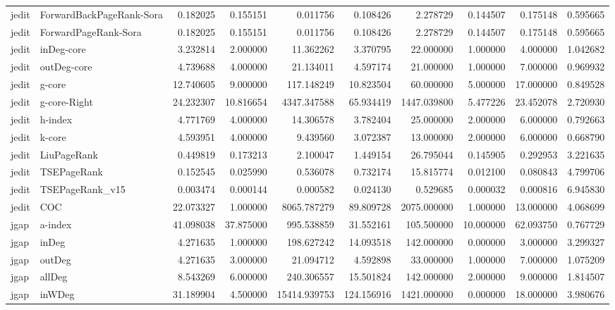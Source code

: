 \begin{tabular}{llrrrrrrrr}
jedit & ForwardBackPageRank-Sora & 0.182025 & 0.155151 & 0.011756 & 0.108426 & 2.278729 & 0.144507 & 0.175148 & 0.595665 \\
jedit & ForwardPageRank-Sora & 0.182025 & 0.155151 & 0.011756 & 0.108426 & 2.278729 & 0.144507 & 0.175148 & 0.595665 \\
jedit & inDeg-core & 3.232814 & 2.000000 & 11.362262 & 3.370795 & 22.000000 & 1.000000 & 4.000000 & 1.042682 \\
jedit & outDeg-core & 4.739688 & 4.000000 & 21.134011 & 4.597174 & 21.000000 & 1.000000 & 7.000000 & 0.969932 \\
jedit & g-core & 12.740605 & 9.000000 & 117.148249 & 10.823504 & 60.000000 & 5.000000 & 17.000000 & 0.849528 \\
jedit & g-core-Right & 24.232307 & 10.816654 & 4347.347588 & 65.934419 & 1447.039800 & 5.477226 & 23.452078 & 2.720930 \\
jedit & h-index & 4.771769 & 4.000000 & 14.306578 & 3.782404 & 25.000000 & 2.000000 & 6.000000 & 0.792663 \\
jedit & k-core & 4.593951 & 4.000000 & 9.439560 & 3.072387 & 13.000000 & 2.000000 & 6.000000 & 0.668790 \\
jedit & LiuPageRank & 0.449819 & 0.173213 & 2.100047 & 1.449154 & 26.795044 & 0.145905 & 0.292953 & 3.221635 \\
jedit & TSEPageRank & 0.152545 & 0.025990 & 0.536078 & 0.732174 & 15.815774 & 0.012100 & 0.080843 & 4.799706 \\
jedit & TSEPageRank_v15 & 0.003474 & 0.000144 & 0.000582 & 0.024130 & 0.529685 & 0.000032 & 0.000816 & 6.945830 \\
jedit & COC & 22.073327 & 1.000000 & 8065.787279 & 89.809728 & 2075.000000 & 1.000000 & 13.000000 & 4.068699 \\
jgap & a-index & 41.098038 & 37.875000 & 995.538859 & 31.552161 & 105.500000 & 10.000000 & 62.093750 & 0.767729 \\
jgap & inDeg & 4.271635 & 1.000000 & 198.627242 & 14.093518 & 142.000000 & 0.000000 & 3.000000 & 3.299327 \\
jgap & outDeg & 4.271635 & 3.000000 & 21.094712 & 4.592898 & 33.000000 & 1.000000 & 7.000000 & 1.075209 \\
jgap & allDeg & 8.543269 & 6.000000 & 240.306557 & 15.501824 & 142.000000 & 2.000000 & 9.000000 & 1.814507 \\
jgap & inWDeg & 31.189904 & 4.500000 & 15414.939753 & 124.156916 & 1421.000000 & 0.000000 & 18.000000 & 3.980676 \\

\end{tabular}
